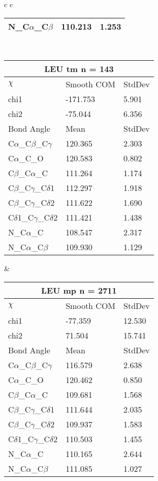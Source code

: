 \begin{longtable}{ c c }
\begin{tabular}{ l l l }
  N\_C$\alpha$\_C$\beta$ & 110.213 & 1.253\\
  \bottomrule
  \end{tabular}
  \\
  \begin{tabular}{ l l l }
  \toprule
  \multicolumn{3}{c}{LEU \textbf{tm} n = 143} \\ \toprule
  $\chi$       & Smooth COM & StdDev \\ \midrule
  chi1 & -171.753 & 5.901 \\ 
  chi2 & -75.044 & 6.356 \\ \midrule
  Bond Angle   & Mean     & StdDev \\ \midrule
  C$\alpha$\_C$\beta$\_C$\gamma$ & 120.365 & 2.303\\
  C$\alpha$\_C\_O & 120.583 & 0.802\\
  C$\beta$\_C$\alpha$\_C & 111.264 & 1.174\\
  C$\beta$\_C$\gamma$\_C$\delta$1 & 112.297 & 1.918\\
  C$\beta$\_C$\gamma$\_C$\delta$2 & 111.622 & 1.690\\
  C$\delta$1\_C$\gamma$\_C$\delta$2 & 111.421 & 1.438\\
  N\_C$\alpha$\_C & 108.547 & 2.317\\
  N\_C$\alpha$\_C$\beta$ & 109.930 & 1.129\\
  \bottomrule
  \end{tabular}
  &
  \begin{tabular}{ l l l }
  \toprule
  \multicolumn{3}{c}{LEU \textbf{mp} n = 2711} \\ \toprule
  $\chi$       & Smooth COM & StdDev \\ \midrule
  chi1 & -77.359 & 12.530 \\ 
  chi2 & 71.504 & 15.741 \\ \midrule
  Bond Angle   & Mean     & StdDev \\ \midrule
  C$\alpha$\_C$\beta$\_C$\gamma$ & 116.579 & 2.638\\
  C$\alpha$\_C\_O & 120.462 & 0.850\\
  C$\beta$\_C$\alpha$\_C & 109.681 & 1.568\\
  C$\beta$\_C$\gamma$\_C$\delta$1 & 111.644 & 2.035\\
  C$\beta$\_C$\gamma$\_C$\delta$2 & 109.937 & 1.583\\
  C$\delta$1\_C$\gamma$\_C$\delta$2 & 110.503 & 1.455\\
  N\_C$\alpha$\_C & 110.165 & 2.644\\
  N\_C$\alpha$\_C$\beta$ & 111.085 & 1.027\\

\end{tabular}
\end{longtable}
